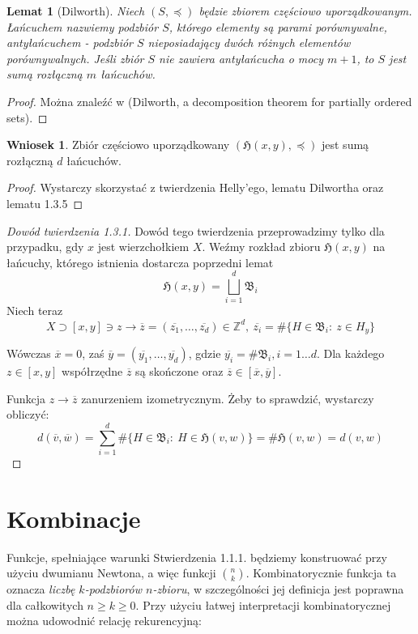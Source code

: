 \documentclass[licencjacka]{pracamgr}
\theoremstyle{definition}
\theoremstyle{definition}
\theoremstyle{definition}
\theoremstyle{definition}
\theoremstyle{definition}
\newtheorem{corollary}{Wniosek}[section]
\theoremstyle{plain}
\newtheorem{lemma}{Lemat}[section]
\theoremstyle{plain}
\begin{document}
\begin{lemma}[Dilworth]
	Niech $ (S, \preceq) $ będzie zbiorem częściowo uporządkowanym. Łańcuchem nazwiemy 
	podzbiór $S $, 
	którego elementy są parami porównywalne, antyłańcuchem - podzbiór $ S $ nieposiadający 
	dwóch różnych elementów porównywalnych. Jeśli zbiór $ S $ nie zawiera antyłańcucha 
	o mocy $ m + 1 $, to $ S $ jest sumą rozłączną $ m $ łańcuchów.
\end{lemma}
\begin{proof}
	Można znaleźć w (Dilworth, a decomposition theorem for partially ordered sets).
\end{proof}
\begin{corollary}
	Zbiór częściowo uporządkowany $ \left(\mathfrak{H}(x,y), \preceq \right) $ 
	jest sumą rozłączną $ d $ 
	łańcuchów.	
\end{corollary}
\begin{proof}
	Wystarczy skorzystać z twierdzenia Helly'ego, lematu Dilwortha oraz 
	lematu 1.3.5 
\end{proof}
\begin{proof}[Dowód twierdzenia 1.3.1]
	Dowód tego twierdzenia przeprowadzimy tylko dla przypadku, gdy $ x $ jest 
	wierzchołkiem $ X $. Weźmy rozkład zbioru $ \mathfrak{H}(x,y)$ na łańcuchy, którego 
	istnienia dostarcza poprzedni lemat
	 $$ \mathfrak{H}(x,y) = \bigsqcup\limits_{i=1}^{d} \mathfrak{B}_i  $$
	Niech teraz 
	$$ X \supset [x,y] \ni z \rightarrow \overline{z} = (\overline{z_1}, \dots, 
	\overline{z_d}) \in \mathbb{Z}^d, ~ \overline{z_i} = \# \{H \in \mathfrak{B}_i: ~ 
	z \in H_y\} $$

	Wówczas $ \overline{x} = 0$, zaś $ \overline{y} = (\overline{y_1}, \dots, 
	\overline{y_d}) $, gdzie $ \overline{y_i} = \# \mathfrak{B}_i, i = 1 \dots d$. 
	Dla każdego $ z \in [x,y] $ współrzędne $ \overline{z} $ są skończone oraz 
	$ \overline{z} \in [\overline{x}, \overline{y}] $.

	Funkcja $ z \rightarrow \overline{z} $ zanurzeniem izometrycznym. Żeby to sprawdzić, 
	wystarczy obliczyć:
	$$ d(\overline{v}, \overline{w}) = \sum\limits_{i=1}^d \# \{ 
	H \in \mathfrak{B}_i: ~ H \in \mathfrak{H}(v,w) \} = \# \mathfrak{H}(v,w) = 
	d(v,w)$$
\end{proof}

\section{Kombinacje}
Funkcje, spełniające warunki Stwierdzenia 1.1.1. będziemy konstruować przy 
użyciu dwumianu Newtona, a więc funkcji $ {n \choose k} $. Kombinatorycznie funkcja ta 
oznacza \textit{liczbę $ k $-podzbiorów $ n $-zbioru}, w szczególności jej definicja jest 
poprawna dla całkowitych $ n \geq k \geq 0 $. Przy użyciu łatwej interpretacji 
kombinatorycznej można udowodnić relację rekurencyjną:
\end{document}

